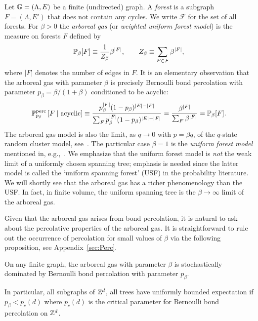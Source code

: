 \documentclass[11pt]{amsart}
\numberwithin{equation}{section}
\numberwithin{theorem}{section}
\newcommand{\cc}[1]{\mathcal{#1}}
\newcommand{\cb}[1]{\left[#1\right ]} %
\begin{document}
Let ${\mathbb G} = (\Lambda,E)$ be a finite (undirected) graph.  A
\emph{forest} is a subgraph $F=(\Lambda, E')$ that does not contain
any cycles. We write $\cc F$ for the set of all forests. 
For $\beta>0$ the \emph{arboreal gas} (or \emph{weighted
  uniform forest model}) is the measure on forests $F$ defined by
\begin{equation} \label{e:P-forest}
  \P_{\beta}[F] \bydef \frac{1}{Z_{\beta}} \beta^{|F|},
  \qquad
  Z_{\beta} \bydef \sum_{F\in\cc F} \beta^{|F|},
\end{equation}
where $|F|$ denotes the number of edges in $F$.
%
%
It is an elementary observation that
the arboreal gas with parameter $\beta$ is precisely Bernoulli bond
percolation with parameter $p_{\beta}=\beta/(1+\beta)$ conditioned to be
acyclic:
\begin{equation} \label{e:Pperc}
  \P_{p_{\beta}}^{\rm perc}\cb{F \mid \text{acyclic}} 
  \bydef \frac{p_{\beta}^{\abs{F}}(1-p_{\beta})^{\abs{E}-\abs{F}}}{\sum_{F}
    p_{\beta}^{\abs{F}}(1-p_{\beta})^{\abs{E}-\abs{F}}}
  = \frac{ \beta^{\abs{F}}}{\sum_{F}\beta^{\abs{F}}}
  = \P_\beta[F].
\end{equation}
%
The arboreal gas model is  also the limit, as  $q\to 0$ with $p=\beta q$, of
the $q$-state random cluster model, see~\cite{MR1757964}.
The particular case $\beta=1$ is the \emph{uniform forest model} mentioned
in, e.g.,~\cite{MR1757964,MR2724667,MR2060630,MR2243761}.  We
emphasize that the uniform forest model is \emph{not} the weak limit
of a uniformly chosen spanning tree; emphasis is needed since the
latter model is called the `uniform spanning forest' (USF) in the
probability literature. We will shortly see that the arboreal gas has
a richer phenomenology than the USF.  In fact, in finite
volume, the uniform spanning tree
is the $\beta\to \infty$ limit of the arboreal gas.

Given that the arboreal gas arises from bond percolation, it is
natural to ask about the percolative properties of the arboreal
gas.
It is straightforward to rule out the occurrence of
percolation for small values of $\beta$ via the following
proposition, see Appendix~\ref{sec:Perc}.

\begin{proposition}
  \label{prop:dom}
  On any finite graph, the arboreal gas with parameter $\beta$ is
  stochastically dominated by Bernoulli bond percolation with
  parameter $p_{\beta}$.
\end{proposition}
%
In particular, all subgraphs of $\mathbb{Z}^{d}$, all trees
have uniformly bounded expectation if
$p_{\beta}<p_{c}(d)$ where $p_{c}(d)$ is the critical parameter for
Bernoulli bond percolation on $\mathbb{Z}^{d}$. 
\end{document}
